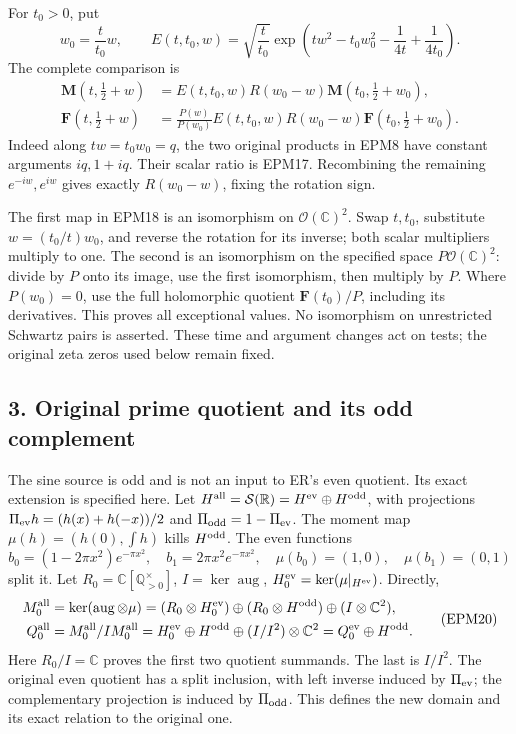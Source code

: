 \documentclass[
  10pt,
  a4paper,
]{article}
\begin{document}
For \(t_0>0\), put \[
w_0=\frac t{t_0}w,\qquad
E(t,t_0,w)=\sqrt{\frac t{t_0}}
\exp\left(tw^2-t_0w_0^2-\frac1{4t}+\frac1{4t_0}\right).
\tag{EPM17}
\] The complete comparison is \[
\begin{aligned}
\mathbf M(t,\tfrac12+w)&=E(t,t_0,w)R(w_0-w)
\mathbf M(t_0,\tfrac12+w_0),\\
\mathbf F(t,\tfrac12+w)&=\frac{P(w)}{P(w_0)}E(t,t_0,w)
R(w_0-w)\mathbf F(t_0,\tfrac12+w_0).
\end{aligned}\tag{EPM18}
\] Indeed along \(tw=t_0w_0=q\), the two original products in EPM8 have
constant arguments \(iq,1+iq\). Their scalar ratio is EPM17. Recombining
the remaining \(e^{-iw},e^{iw}\) gives exactly \(R(w_0-w)\), fixing the
rotation sign.

The first map in EPM18 is an isomorphism on \(\mathcal O(\mathbb C)^2\).
Swap \(t,t_0\), substitute \(w=(t_0/t)w_0\), and reverse the rotation
for its inverse; both scalar multipliers multiply to one. The second is
an isomorphism on the specified space \(P\mathcal O(\mathbb C)^2\):
divide by \(P\) onto its image, use the first isomorphism, then multiply
by \(P\). Where \(P(w_0)=0\), use the full holomorphic quotient
\(\mathbf F(t_0)/P\), including its derivatives. This proves all
exceptional values. No isomorphism on unrestricted Schwartz pairs is
asserted. These time and argument changes act on tests; the original
zeta zeros used below remain fixed.

\subsection{3. Original prime quotient and its odd
complement}\label{original-prime-quotient-and-its-odd-complement}

The sine source is odd and is not an input to ER's even quotient. Its
exact extension is specified here. Let
\(H^{\rm all}=\mathcal S(\mathbb R)=H^{\rm ev}\oplus H^{\rm odd}\), with
projections \(\Pi_{\rm ev}h=(h(x)+h(-x))/2\) and
\(\Pi_{\rm odd}=1-\Pi_{\rm ev}\). The moment map
\(\mu(h)=(h(0),\int h)\) kills \(H^{\rm odd}\). The even functions \[
b_0=(1-2\pi x^2)e^{-\pi x^2},\quad b_1=2\pi x^2e^{-\pi x^2},
\quad \mu(b_0)=(1,0),\quad\mu(b_1)=(0,1)
\tag{EPM19}
\] split it. Let \(R_0=\mathbb C[\mathbb Q_{>0}^{\times}]\),
\(I=\ker\operatorname{aug}\), \(H_0^{\rm ev}=\ker(\mu|_{H^{\rm ev}})\).
Directly, \[
\begin{aligned}
M_0^{\rm all}&=\ker(\operatorname{aug}\otimes\mu)
=(R_0\otimes H_0^{\rm ev})\oplus(R_0\otimes H^{\rm odd})\oplus(I\otimes\mathbb C^2),\\
Q_0^{\rm all}&=M_0^{\rm all}/IM_0^{\rm all}
=H_0^{\rm ev}\oplus H^{\rm odd}\oplus(I/I^2)\otimes\mathbb C^2
=Q_0^{\rm ev}\oplus H^{\rm odd}.
\end{aligned}\tag{EPM20}
\] Here \(R_0/I=\mathbb C\) proves the first two quotient summands. The
last is \(I/I^2\). The original even quotient has a split inclusion,
with left inverse induced by \(\Pi_{\rm ev}\); the complementary
projection is induced by \(\Pi_{\rm odd}\). This defines the new domain
and its exact relation to the original one.
\end{document}
